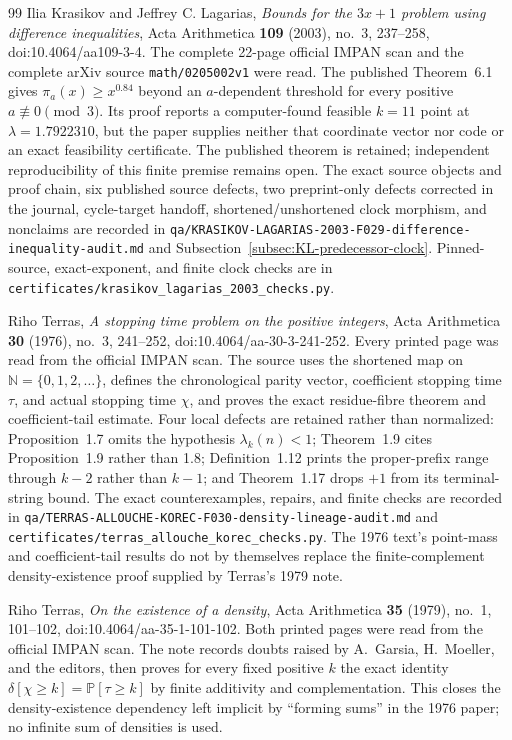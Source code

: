 \begin{thebibliography}{99}
Ilia Krasikov and Jeffrey C. Lagarias,
\emph{Bounds for the $3x+1$ problem using difference inequalities},
Acta Arithmetica \textbf{109} (2003), no.~3, 237--258,
doi:10.4064/aa109-3-4.  The complete 22-page official IMPAN scan and the
complete arXiv source \texttt{math/0205002v1} were read.  The published
Theorem~6.1 gives
\(\pi_a(x)\ge x^{0.84}\) beyond an \(a\)-dependent threshold for every
positive \(a\not\equiv0\pmod3\).  Its proof reports a computer-found feasible
\(k=11\) point at \(\lambda=1.7922310\), but the paper supplies neither that
coordinate vector nor code or an exact feasibility certificate.  The
published theorem is retained; independent reproducibility of this finite
premise remains open.  The exact source objects and proof chain, six
published source defects, two preprint-only defects corrected in the
journal, cycle-target handoff, shortened/unshortened clock morphism, and
nonclaims are recorded in
\texttt{qa/KRASIKOV-LAGARIAS-2003-F029-difference-inequality-audit.md} and
Subsection~\ref{subsec:KL-predecessor-clock}.  Pinned-source, exact-exponent,
and finite clock checks are in
\texttt{certificates/krasikov\_lagarias\_2003\_checks.py}.

Riho Terras,
\emph{A stopping time problem on the positive integers},
Acta Arithmetica \textbf{30} (1976), no.~3, 241--252,
doi:10.4064/aa-30-3-241-252.  Every printed page was read from the official
IMPAN scan.  The source uses the shortened map on
\(\mathbb N=\{0,1,2,\ldots\}\), defines the chronological parity vector,
coefficient stopping time \(\tau\), and actual stopping time \(\chi\), and
proves the exact residue-fibre theorem and coefficient-tail estimate.  Four
local defects are retained rather than normalized: Proposition~1.7 omits the
hypothesis \(\lambda_k(n)<1\); Theorem~1.9 cites Proposition~1.9 rather than
1.8; Definition~1.12 prints the proper-prefix range through \(k-2\) rather
than \(k-1\); and Theorem~1.17 drops \(+1\) from its terminal-string bound.
The exact counterexamples, repairs, and finite checks are recorded in
\texttt{qa/TERRAS-ALLOUCHE-KOREC-F030-density-lineage-audit.md} and
\texttt{certificates/terras\_allouche\_korec\_checks.py}.  The 1976 text's
point-mass and coefficient-tail results do not by themselves replace the
finite-complement density-existence proof supplied by Terras's 1979 note.

Riho Terras,
\emph{On the existence of a density},
Acta Arithmetica \textbf{35} (1979), no.~1, 101--102,
doi:10.4064/aa-35-1-101-102.  Both printed pages were read from the official
IMPAN scan.  The note records doubts raised by A.~Garsia, H.~Moeller, and the
editors, then proves for every fixed positive \(k\) the exact identity
\(\delta[\chi\geq k]=\mathbb P[\tau\geq k]\) by finite additivity and
complementation.  This closes the density-existence dependency left implicit
by ``forming sums'' in the 1976 paper; no infinite sum of densities is used.


\end{thebibliography}
